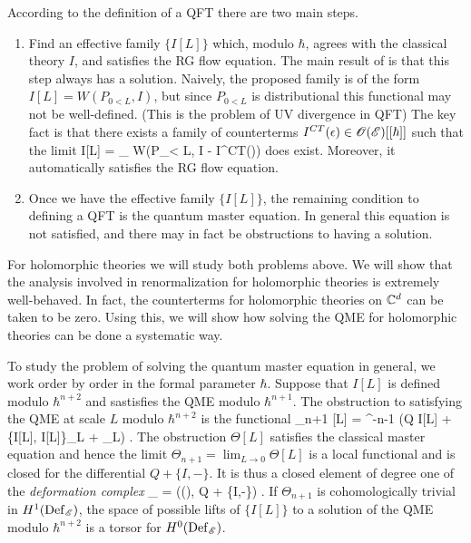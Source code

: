 According to the definition of a QFT there are two main steps. 

\begin{enumerate}
\item Find an effective family $\{I[L]\}$ which, modulo $\hbar$, agrees with the classical theory $I$, and satisfies the RG flow equation. 
The main result of \cite{CostelloRenormalization} is that this step always has a solution. 
Naively, the proposed family is of the form $I[L] = W(P_{0<L}, I)$, but since $P_{0<L}$ is distributional this functional may not be well-defined. (This is the problem of UV divergence in QFT)
The key fact is that there exists a family of counterterms $I^{CT}(\epsilon) \in \mathscr O(\mathscr E)[[\hbar]]$ such that the limit
\ben
I[L] = \lim_{\epsilon {}} W(P_{\epsilon < L}, I - I^{CT}(\epsilon))
\een
does exist.
Moreover, it automatically satisfies the RG flow equation.
\item Once we have the effective family $\{I[L]\}$, the remaining condition to defining a QFT is the quantum master equation.
In general this equation is not satisfied, and there may in fact be obstructions to having a solution.
\end{enumerate}

For holomorphic theories we will study both problems above.
We will show that the analysis involved in renormalization for holomorphic theories is extremely well-behaved. 
In fact, the counterterms for holomorphic theories on $\mathbb C^d$ can be taken to be zero.
Using this, we will show how solving the QME for holomorphic theories can be done a systematic way.

To study the problem of solving the quantum master equation in general, we work order by order in the formal parameter $\hbar$.
Suppose that $I[L]$ is defined modulo $\hbar^{n+2}$ and sastisfies the QME modulo $\hbar^{n+1}$.
The obstruction to satisfying the QME at scale $L$ modulo $\hbar^{n+2}$ is the functional
\ben
\Theta_{n+1} [L] = \hbar^{-n-1} (Q I[L] + \{I[L], I[L]\}_L + \hbar \Delta_L) .
\een
The obstruction $\Theta[L]$ satisfies the classical master equation and hence the limit $\Theta_{n+1} = \lim_{L \to 0} \Theta[L]$ is a local functional and is closed for the differential $Q + \{I, -\}$. 
It is thus a closed element of degree one of the {\em deformation complex}
\ben
\Def_{\sE} = \left(\oloc(\sE), Q + \{I,-\}\right) .
\een
If $\Theta_{n+1}$ is cohomologically trivial in $H^1({\rm Def}_{\mathscr E})$, the space of possible lifts of $\{I[L]\}$ to a solution of the QME modulo $\hbar^{n+2}$ is a torsor for $H^0({\rm Def}_{\mathscr E})$. 

